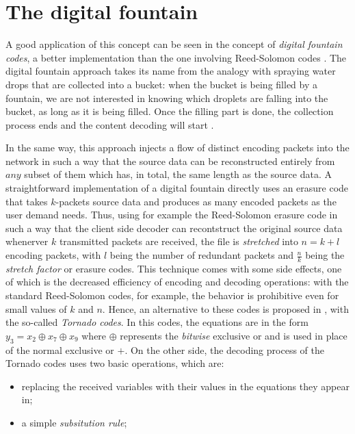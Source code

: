 \section{The digital fountain}
\label{sec:tornado}
A good application of this concept can be seen in the concept of \textit{digital fountain codes}, a better implementation than the one involving Reed-Solomon codes \cite{Byers}.
The digital fountain approach takes its name from the analogy with spraying water drops that are collected into a bucket: when the bucket is being filled by a fountain, we are not interested in knowing which droplets are falling into the bucket, as long as it is being filled. Once the filling part is done, the collection process ends and the content decoding will start \cite{Lu}.

In the same way, this approach injects a flow of distinct encoding packets into the network in such a way that the source data can be reconstructed entirely from $any$ subset of them which has, in total, the same length as the source data.
A straightforward implementation of a digital fountain directly uses an erasure code that takes $k$-packets source data and produces as many encoded packets as the user demand needs. Thus, using for example the Reed-Solomon erasure code in such a way that the client side decoder can recontstruct the original source data whenerver $k$ transmitted packets are received, the file is \textit{stretched} into $n = k+l$ encoding packets, with $l$ being the number of redundant packets and $\frac{n}{k}$ being the \textit{stretch factor} or erasure codes. This technique comes with some side effects, one of which is the decreased efficiency of encoding and decoding operations: with the standard Reed-Solomon codes, for example, the behavior is prohibitive even for small values of $k$ and $n$. Hence, an alternative to these codes is proposed in \cite{Byers}, with the so-called \textit{Tornado codes}. In this codes, the equations are in the form $y_3 = x_2 \oplus x_7 \oplus x_9$ where $\oplus$ represents the \textit{bitwise} exclusive or and is used in place of the normal exclusive or $+$. On the other side, the decoding process of the Tornado codes uses two basic operations, which are:
\begin{itemize}
  \item replacing the received variables with their values in the equations they appear in;
  \item a simple \textit{subsitution rule};
\end{itemize}
